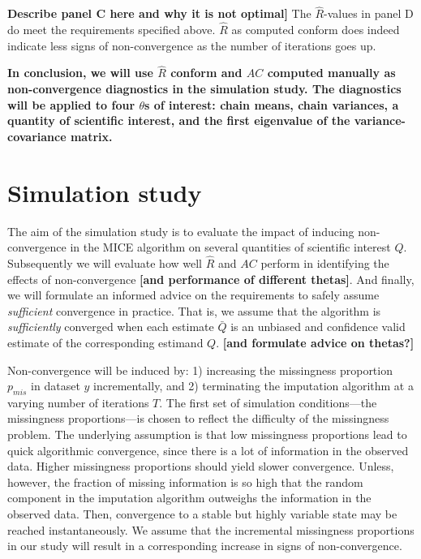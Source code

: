 \documentclass[Royal,times,sageh]{sagej}
\begin{document}
\textbf{Describe panel C here and why it is not optimal{]}} The \(\widehat{R}\)-values in panel D do meet the requirements specified above. \(\widehat{R}\) as computed conform \citet{veht19} does indeed indicate less signs of non-convergence as the number of iterations goes up. \textbf{\citep[explain the dip in Rhat values at t=2. Namely, because we can only use 2 of the 3 tricks by][ if the number of iterations is very low (t\textless4). That's why the \(\widehat{R}\)s are more similar to the traditional GR.]{veht19}}

\textbf{In conclusion, we will use \(\widehat{R}\) conform \citet{veht19} and \(AC\) computed manually as non-convergence diagnostics in the simulation study. The diagnostics will be applied to four \(\theta\)s of interest: chain means, chain variances, a quantity of scientific interest, and the first eigenvalue of the variance-covariance matrix.}

\hypertarget{simulation-study}{%
\section{Simulation study}\label{simulation-study}}

The aim of the simulation study is to evaluate the impact of inducing non-convergence in the MICE algorithm on several quantities of scientific interest \(Q\). Subsequently we will evaluate how well \(\widehat{R}\) and \(AC\) perform in identifying the effects of non-convergence \textbf{{[}and performance of different thetas{]}}. And finally, we will formulate an informed advice on the requirements to safely assume \emph{sufficient} convergence in practice. That is, we assume that the algorithm is \emph{sufficiently} converged when each estimate \(\bar{Q}\) is an unbiased and confidence valid estimate of the corresponding estimand \(Q\). \textbf{{[}and formulate advice on thetas?{]}}

Non-convergence will be induced by: 1) increasing the missingness proportion \(p_{mis}\) in dataset \(y\) incrementally, and 2) terminating the imputation algorithm at a varying number of iterations \(T\). The first set of simulation conditions---the missingness proportions---is chosen to reflect the difficulty of the missingness problem. The underlying assumption is that low missingness proportions lead to quick algorithmic convergence, since there is a lot of information in the observed data. Higher missingness proportions should yield slower convergence. Unless, however, the fraction of missing information is so high that the random component in the imputation algorithm outweighs the information in the observed data. Then, convergence to a stable but highly variable state may be reached instantaneously. We assume that the incremental missingness proportions in our study will result in a corresponding increase in signs of non-convergence.
\end{document}
